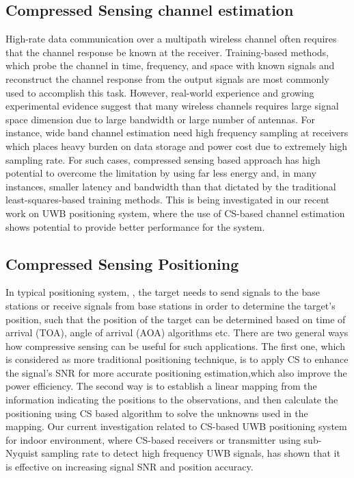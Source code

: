 \subsection{Compressed Sensing channel estimation}
High-rate data communication over a multipath wireless channel often requires that the channel response be known at the receiver. Training-based methods, which probe the channel in time, frequency, and space with known signals and reconstruct the channel response from the output signals are most commonly used to accomplish this task. However, real-world experience and growing experimental evidence suggest that many wireless channels requires large signal space dimension due to large bandwidth or large number of antennas. For instance, wide band channel estimation need high frequency sampling at receivers which places heavy burden on data storage and power cost due to extremely high sampling rate. For such cases, compressed sensing based approach has high potential to overcome the limitation by using far less energy and, in many instances, smaller latency and bandwidth than that dictated by the traditional least-squares-based training methods\cite{bajwa2010compressed}. This is being investigated in our recent work on UWB positioning system, where the use of CS-based channel estimation shows potential to provide better performance for the system.

\subsection{Compressed Sensing Positioning}
In typical positioning system, , the target needs to send signals to the base stations or receive signals from base stations in order to determine the target’s position, such that the position of the target can be determined based on time of arrival (TOA), angle of arrival (AOA) algorithms etc. There are two general ways how compressive sensing can be useful for such applications\cite{han2013compressive}. The first one, which is considered as more traditional positioning technique, is to apply CS to enhance the signal’s SNR for more accurate positioning estimation,which also improve the power efficiency. The second way is to establish a linear mapping from the information indicating the positions to the observations, and then calculate the positioning using CS based algorithm to solve the unknowns used in the mapping. Our current investigation related to CS-based UWB positioning system for indoor environment, where CS-based receivers or transmitter using sub-Nyquist sampling rate to detect high frequency UWB signals, has shown that it is effective on increasing signal SNR and position accuracy.

